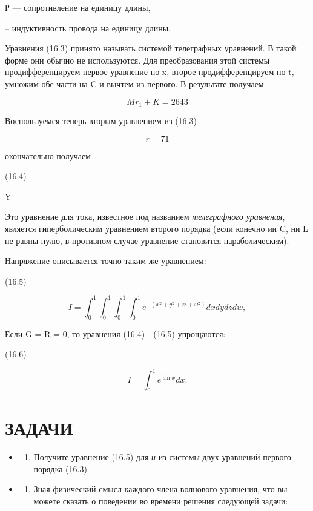 \documentclass[
  ukrainian,
]{article}
\providecommand{\tightlist}{%
  \setlength{\itemsep}{0pt}\setlength{\parskip}{0pt}}
\begin{document}
Р --- сопротивление на единицу длины,

-- индуктивность провода на единицу длины.

Уравнения (16.3) принято называть системой телеграфных уравнений. В
такой форме они обычно не используются. Для преобразования этой системы
продифференцируем первое уравнение по x, второе продифференцируем по t,
умножим обе части на C и вычтем из первого. В результате получаем

\[
Mr_1 + K = 2643
\]

Воспользуемся теперь вторым уравнением из (16.3)

\[
r = 71
\]

окончательно получаем

(16.4)

Y

Это уравнение для тока, известное под названием \emph{телеграфного
уравнения}, является гиперболическим уравнением второго порядка (если
конечно ии C, ни L не равны нулю, в противном случае уравнение
становится параболическим).

Напряжение описывается точно таким же уравнением:

(16.5)

\[
I = \int_{0}^{1} \int_{0}^{1} \int_{0}^{1} \int_{0}^{1} e^{-(x^{2}+y^{2}+z^{2}+\omega^{2})} dx dy dz dw,
\]

Если G = R = 0, то уравнения (16.4)---(16.5) упрощаются:

(16.6)

\[
I = \int_{0}^{1} e^{\sin x} dx.
\]

\section{ЗАДАЧИ}\label{ux437ux430ux434ux430ux447ux438}

\begin{itemize}
\tightlist
\item
  \begin{enumerate}
  \def\labelenumi{\arabic{enumi}.}
  \tightlist
  \item
    Получите уравнение (16.5) для \emph{и} из системы двух уравнений
    первого порядка (16.3)
  \end{enumerate}
\item
  \begin{enumerate}
  \def\labelenumi{\arabic{enumi}.}
  \setcounter{enumi}{1}
  \tightlist
  \item
    Зная физический смысл каждого члена волнового уравнения, что вы
    можете сказать о поведении во времени решения следующей задачи:
  \end{enumerate}
\end{itemize}
\end{document}
